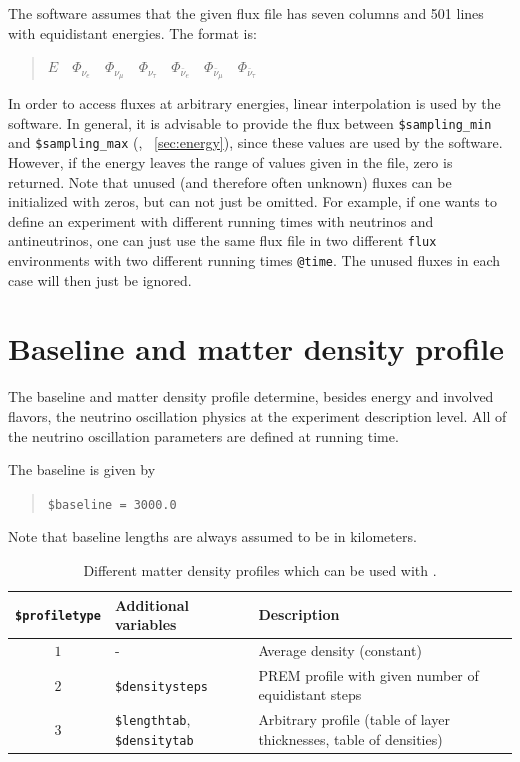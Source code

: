 The software assumes that the given flux file has seven columns and
501 lines with equidistant energies. The format is:
\begin{quotation}
$ E\quad
\Phi_{\nu_e}\quad
\Phi_{\nu_\mu}\quad
\Phi_{\nu_\tau}\quad
\Phi_{\bar\nu_e}\quad
\Phi_{\bar\nu_\mu}\quad
\Phi_{\bar\nu_\tau}$
\end{quotation}
In order to access fluxes at arbitrary energies, linear interpolation 
is used by the software. In general, it is advisable to provide the flux between {\tt \$sampling\_min} and {\tt \$sampling\_max} (\cf, \Sec~\ref{sec:energy}), since these values are used by the software. However, if the energy leaves the range of values given in the file, zero is returned. 
Note that unused (and therefore often unknown) fluxes can be initialized with zeros, but can not just be omitted. For example, if one wants to define an experiment with different running times with neutrinos and antineutrinos, one can just use the same flux file in two different {\tt flux} environments with two different running times {\tt @time}. The unused fluxes in each case will then just be ignored.


\section{Baseline and matter density profile}

The baseline and matter density profile determine, besides energy and
involved flavors, the neutrino oscillation physics at the experiment
description level. All of the neutrino oscillation parameters are defined at running time.

The baseline is given by
\begin{quote}
{\tt \$baseline = 3000.0 }
\end{quote}
Note that baseline lengths are always assumed to be in
kilometers.

\begin{table}[t!]
\begin{tabular}{|clp{7cm}|}
\hline
{\tt \$profiletype} & Additional variables & Description \\ 
\hline
$1$ & - & Average density (constant) \\
$2$ & {\tt \$densitysteps} & PREM profile with given number of equidistant steps \\
$3$ & {\tt \$lengthtab},  {\tt \$densitytab} & Arbitrary profile (table of layer thicknesses, table of densities) \\
\hline
\end{tabular}
\caption{\label{tab:profiletypes} Different matter density profiles which can be used with \GLOBES .}
\end{table}

